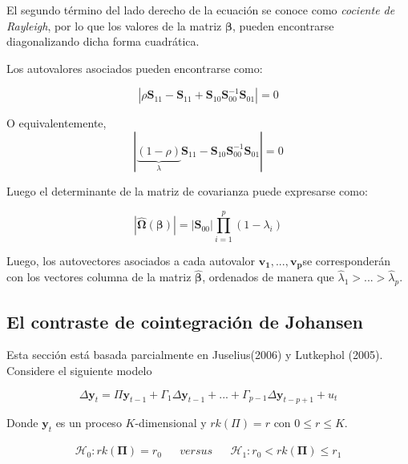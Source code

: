 \documentclass[12pt, twoside]{book}\usepackage[]{graphicx}\usepackage[]{color}
\let\bf\mathbf
\numberwithin{equation}{section}
\numberwithin{theorem}{section}
\numberwithin{teorema}{section}
\numberwithin{defi}{section}
\numberwithin{prop}{section}
\numberwithin{defi}{section}
\theoremstyle{plain}
\begin{document}
El segundo término del lado derecho de la ecuación se conoce como \textit{cociente de Rayleigh}, por lo que los valores de la matriz $\boldsymbol{\beta}$, pueden encontrarse diagonalizando dicha forma cuadrática. 

Los autovalores asociados pueden encontrarse como: 

\begin{equation}
|\rho\mathbf{S}_{11}-\mathbf{S}_{11}+\mathbf{S}_{10}\mathbf{S}_{00}^{-1}\mathbf{S}_{01}|=0
\end{equation}

O equivalentemente, 
\begin{equation}
|\underbrace{(1-\rho)}_{\lambda}\mathbf{S}_{11}-\mathbf{S}_{10}\mathbf{S}_{00}^{-1}\mathbf{S}_{01}|=0
\end{equation}

Luego el determinante de la matriz de covarianza puede expresarse como: 

\begin{equation}
|\hat{\boldsymbol{\Omega}}(\boldsymbol{\beta})| = |\mathbf{S}_{00}|\prod_{i=1}^{p}(1-\lambda_{i})
\end{equation}

Luego, los autovectores asociados a cada autovalor $\mathbf{v_{1},...,v_{p}}$se corresponderán con los vectores columna de la matriz $\hat{\boldsymbol{\beta}}$, ordenados de manera que $\hat{\lambda}_{1}>...>\hat{\lambda}_{p}$.



\subsection{El contraste de cointegración de Johansen}

Esta sección está basada parcialmente en Juselius(2006) y Lutkephol (2005). Considere el siguiente modelo 

\begin{equation}
\Delta \bf{y}_{t} = \Pi \bf{y}_{t-1}+\Gamma_{1}\Delta\bf{y}_{t-1}+...+\Gamma_{p-1}\Delta\bf{y}_{t-p+1}+u_{t}
\end{equation}

Donde $\bf{y}_{t}$ es un proceso $K$-dimensional y $rk(\Pi)=r$ con  $0\leq r\leq K$. 

\begin{align}
\mathcal{H}_{0}: rk(\mathbf{\Pi})=r_{0} && versus && \mathcal{H}_{1}: r_{0}< rk(\mathbf{\Pi}) \leq r_{1} \label{hipo_johansen1}
\end{align} 
\end{document}
